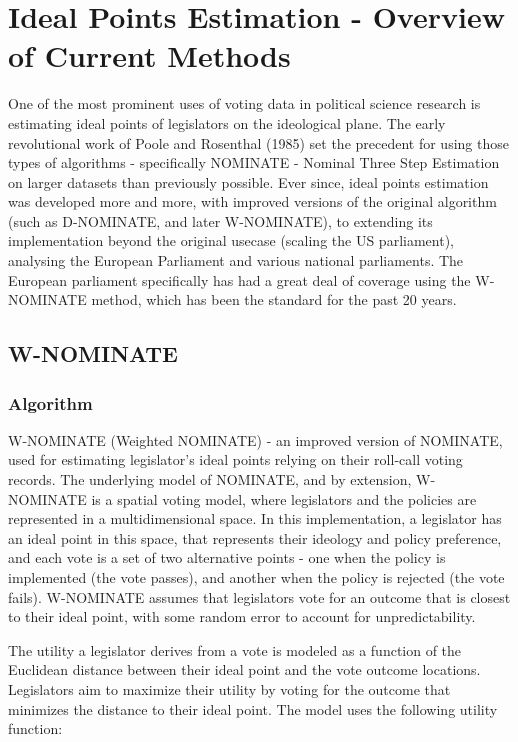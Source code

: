 \documentclass[a4paper,12pt]{report}
\begin{document}
    \chapter{Ideal Points Estimation - Overview of Current Methods}
    \label{ch:ideal-points-estimation---overview-of-current-methods}
    One of the most prominent uses of voting data in political science research is estimating ideal points of
    legislators on the ideological plane. The early revolutional work of Poole and Rosenthal (1985) set the
    precedent for using those types of algorithms - specifically NOMINATE - Nominal Three Step Estimation on
    larger datasets than previously possible. Ever since, ideal points estimation was developed more and more,
    with improved versions of the original algorithm (such as D-NOMINATE, and later W-NOMINATE), to extending
    its implementation beyond the original usecase (scaling the US parliament), analysing the European
    Parliament and various national parliaments. The European parliament specifically has had a great deal of
    coverage using the W-NOMINATE method, which has been the standard for the past 20 years.


    \section{W-NOMINATE}

    \subsection{Algorithm}

    W-NOMINATE (Weighted NOMINATE) - an improved version of NOMINATE, used for estimating legislator's
    ideal points relying on their roll-call voting records. The underlying model of NOMINATE, and by
    extension, W-NOMINATE is a spatial voting model, where legislators and the policies are represented
    in a multidimensional space. In this implementation, a legislator has an ideal point in this space,
    that represents their ideology and policy preference, and each vote is a set of two alternative
    points - one when the policy is implemented (the vote passes), and another when the policy is
    rejected (the vote fails). W-NOMINATE assumes that legislators vote for an outcome that is closest
    to their ideal point, with some random error to account for unpredictability.

    The utility a legislator derives from a vote is modeled as a function of the Euclidean distance between
    their ideal point and the vote outcome locations. Legislators aim to maximize their utility by voting
    for the outcome that minimizes the distance to their ideal point. The model uses the following utility
    function:
\end{document}
